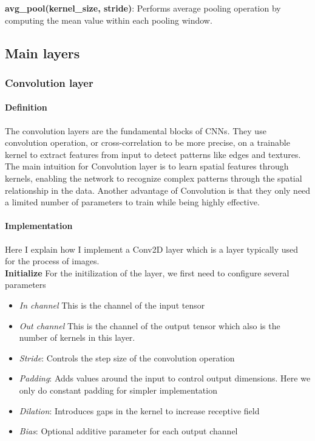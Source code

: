 \documentclass[conference]{IEEEtran}
\begin{document}
\textbf{avg\_pool(kernel\_size, stride)}: Performs average pooling operation by computing the mean value within each pooling window.

\subsection{Main layers}
\subsubsection{Convolution layer}
\paragraph{Definition} The convolution layers are the fundamental blocks of CNNs. They use convolution operation, or cross-correlation to be more precise, on a trainable kernel to extract features from input to detect patterns like edges and textures. The main intuition for Convolution layer is to learn spatial features through kernels, enabling the network to recognize complex patterns through the spatial relationship in the data. Another advantage of Convolution is that they only need a limited number of parameters to train while being highly effective.


\paragraph{Implementation} Here I explain how I implement a Conv2D layer which is a layer typically used for the process of images. \\

\textbf{Initialize} For the initilization of the layer, we first need to configure several parameters
\begin{itemize}
    \item \textit{In channel} This is the channel of the input tensor
    \item \textit{Out channel} This is the channel of the output tensor which also is the number of kernels in this layer.
    \item \textit{Stride}: Controls the step size of the convolution operation
    \item \textit{Padding}: Adds values around the input to control output dimensions. Here we only do constant padding for simpler implementation
    \item \textit{Dilation}: Introduces gaps in the kernel to increase receptive field
    \item \textit{Bias}: Optional additive parameter for each output channel
\end{itemize}
\end{document}

